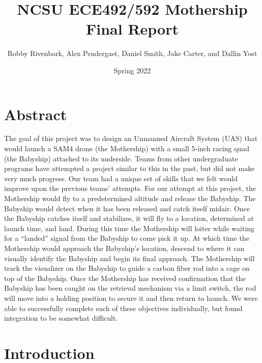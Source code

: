 \documentclass[11pt]{article}
\title{\textbf{NCSU ECE492/592 Mothership Final Report}}
\author{Robby Rivenbark, Alex Pendergast, Daniel Smith, Jake Carter, and Dallin Yost}
\date{Spring 2022}
\begin{document}
\maketitle

\section{Abstract}

The goal of this project was to design an Unmanned Aircraft System (UAS) that would launch a SAM4 drone (the Mothership) with a small 5-inch racing quad (the Babyship) attached to its underside. Teams from other undergraduate programs have attempted a project similar to this in the past, but did not make very much progress. Our team had a unique set of skills that we felt would improve upon the previous teams' attempts. For our attempt at this project, the Mothership would fly to a predetermined altitude and release the Babyship. The Babyship would detect when it has been released and catch itself midair. Once the Babyship catches itself and stabilizes, it will fly to a location, determined at launch time, and land. During this time the Mothership will loiter while waiting for a “landed” signal from the Babyship to come pick it up. At which time the Mothership would approach the Babyship’s location, descend to where it can visually identify the Babyship and begin its final approach. The Mothership will track the visualizer on the Babyship to guide a carbon fiber rod into a cage on top of the Babyship. Once the Mothership has received confirmation that the Babyship has been caught on the retrieval mechanism via a limit switch, the rod will move into a holding position to secure it and then return to launch. We were able to successfully complete each of these objectives individually, but found integration to be somewhat difficult.
\section{Introduction}
\end{document}

